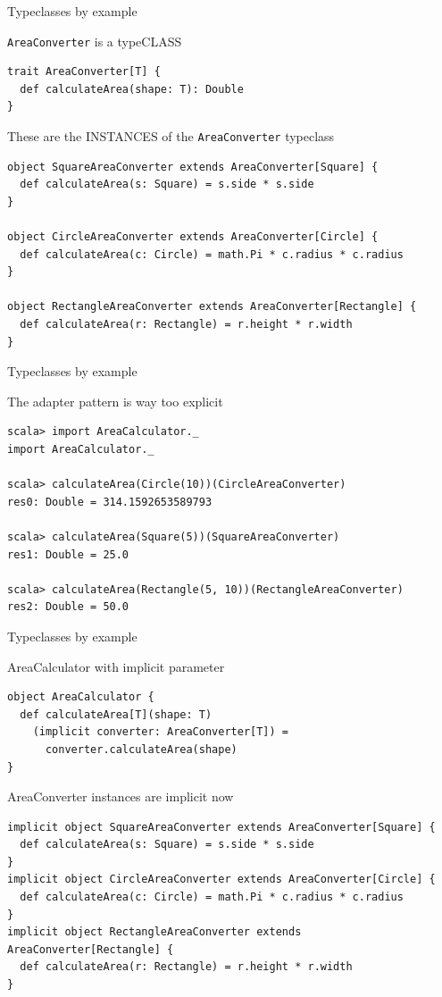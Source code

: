 \begin{frame}[fragile]{Typeclasses by example}
\begin{block}{\lstinline!AreaConverter! is a typeCLASS}
\begin{lstlisting}
trait AreaConverter[T] {
  def calculateArea(shape: T): Double
}
\end{lstlisting}
\end{block}
\begin{block}{These are the INSTANCES of the \lstinline!AreaConverter! typeclass}
\begin{lstlisting}
object SquareAreaConverter extends AreaConverter[Square] {
  def calculateArea(s: Square) = s.side * s.side
}

object CircleAreaConverter extends AreaConverter[Circle] {
  def calculateArea(c: Circle) = math.Pi * c.radius * c.radius
}

object RectangleAreaConverter extends AreaConverter[Rectangle] {
  def calculateArea(r: Rectangle) = r.height * r.width
}
\end{lstlisting}
\end{block}
\end{frame}

\begin{frame}[fragile]{Typeclasses by example}
\begin{block}{The adapter pattern is way too explicit}
\begin{lstlisting}
scala> import AreaCalculator._
import AreaCalculator._

scala> calculateArea(Circle(10))(CircleAreaConverter)
res0: Double = 314.1592653589793

scala> calculateArea(Square(5))(SquareAreaConverter)
res1: Double = 25.0

scala> calculateArea(Rectangle(5, 10))(RectangleAreaConverter)
res2: Double = 50.0
\end{lstlisting}
\end{block}
\end{frame}

\begin{frame}[fragile]{Typeclasses by example}
\begin{exampleblock}{AreaCalculator with implicit parameter}
\begin{lstlisting}
object AreaCalculator {
  def calculateArea[T](shape: T)
    (implicit converter: AreaConverter[T]) =
      converter.calculateArea(shape)
}
\end{lstlisting}
\end{exampleblock}
\begin{exampleblock}{AreaConverter instances are implicit now}
\begin{lstlisting}
implicit object SquareAreaConverter extends AreaConverter[Square] {
  def calculateArea(s: Square) = s.side * s.side
}
implicit object CircleAreaConverter extends AreaConverter[Circle] {
  def calculateArea(c: Circle) = math.Pi * c.radius * c.radius
}
implicit object RectangleAreaConverter extends AreaConverter[Rectangle] {
  def calculateArea(r: Rectangle) = r.height * r.width
}
\end{lstlisting}
\end{exampleblock}
\end{frame}

